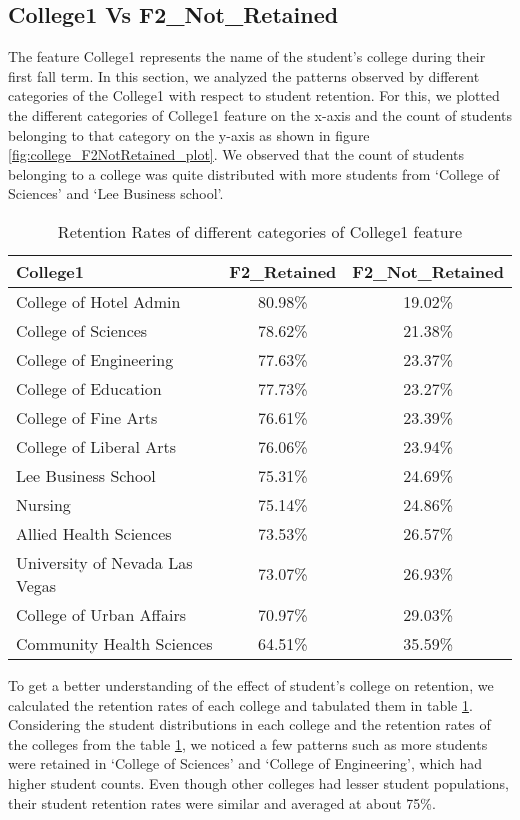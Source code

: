 \documentclass[11pt,openright]{report}
\begin{document}
\subsection {College1 Vs F2\_Not\_Retained}
The feature College1 represents the name of the student's college during their first fall term. In this section, we analyzed the patterns observed by different categories of the College1 with respect to student retention. For this, we plotted the different categories of College1 feature on the x-axis and the count of students belonging to that category on the y-axis as shown in figure \ref{fig:college_F2NotRetained_plot}. We observed that the count of students belonging to a college was quite distributed with more students from `College of Sciences' and `Lee Business school'.


\begin{table}
	\renewcommand{\arraystretch}{1.3}
	\caption{Retention Rates of different categories of College1 feature}
	\label{table:college_retentions}
	\centering
	\begin{tabular}{|l|c|c|}
		\hline
		\bfseries College1 & \bfseries F2\_Retained & \bfseries F2\_Not\_Retained\\
		\hline
		College of Hotel Admin  & 80.98\%  & 19.02\% \\ \hline
		College of Sciences & 78.62\% &  21.38\% \\ \hline
		College of Engineering & 77.63\% & 23.37\% \\ \hline
		College of Education    &   77.73\% &  23.27\% \\ \hline
		College of Fine Arts &  76.61\%  & 23.39\% \\ \hline
		College of Liberal Arts & 76.06\% & 23.94\% \\ \hline
		Lee Business School  & 75.31\% &  24.69\% \\ \hline
		Nursing    &  75.14\%  & 24.86\% \\ \hline
		Allied Health Sciences  & 73.53\% &  26.57\% \\ \hline
		University of Nevada Las Vegas     & 73.07\% &  26.93\% \\ \hline
		College of Urban Affairs  &         70.97\% &  29.03\% \\ \hline
		Community Health Sciences         &    64.51\% & 35.59\% \\ \hline
	\end{tabular}
\end{table}


To get a better understanding of the effect of student's college on retention, we calculated the retention rates of each college and tabulated them in table \ref{table:college_retentions}. Considering the student distributions in each college and the retention rates of the colleges from the table \ref{table:college_retentions}, we noticed a few patterns such as more students were retained in `College of Sciences' and `College of Engineering', which had higher student counts. Even though other colleges had lesser student populations, their student retention rates were similar and averaged at about 75\%.
\end{document}
